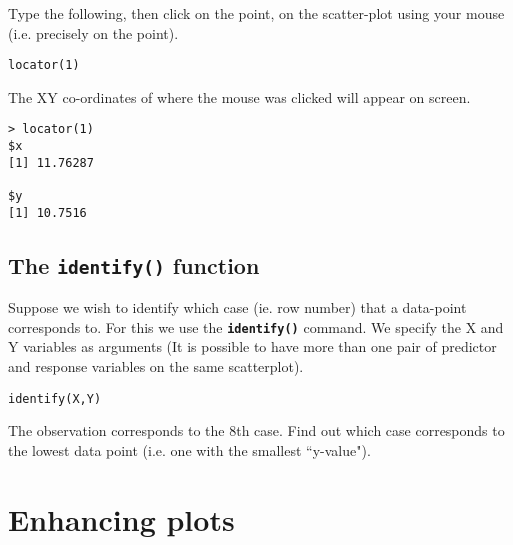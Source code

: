 \noindent Type the following, then click on the point, on the scatter-plot using your mouse (i.e. precisely on the point).


\begin{framed}
\begin{verbatim}
locator(1)
\end{verbatim}
\end{framed}
The XY co-ordinates of where the mouse was clicked will appear on screen.
\begin{framed}
\begin{verbatim}
> locator(1)
$x
[1] 11.76287

$y
[1] 10.7516
\end{verbatim}
\end{framed}

\subsection{The \texttt{identify()} function}
Suppose we wish to identify which case (ie. row number) that a data-point corresponds to.
For this we use the \textbf{\texttt{identify()}} command. We specify the X and Y variables as arguments (It is possible to have more than one pair of predictor and response variables on the same scatterplot).

\begin{framed}
\begin{verbatim}
identify(X,Y)
\end{verbatim}
\end{framed}

\noindent The observation corresponds to the 8th case. Find out which case corresponds to the lowest data point (i.e. one with the smallest ``y-value"). 
\newpage
\section{Enhancing plots}



